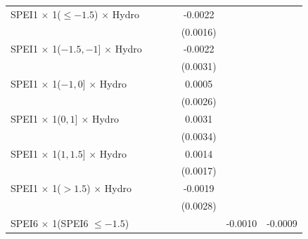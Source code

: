 {\begin{tabular}{l*{6}{c}}
\addlinespace
SPEI1 $\times$ 1($\leq -1.5$) $\times$ Hydro&                     &                     &                     &     -0.0022         &                     &                     \\
                    &                     &                     &                     &    (0.0016)         &                     &                     \\
\addlinespace
SPEI1 $\times$ 1($-1.5,-1$] $\times$ Hydro&                     &                     &                     &     -0.0022         &                     &                     \\
                    &                     &                     &                     &    (0.0031)         &                     &                     \\
\addlinespace
SPEI1 $\times$ 1($-1,0$] $\times$ Hydro&                     &                     &                     &      0.0005         &                     &                     \\
                    &                     &                     &                     &    (0.0026)         &                     &                     \\
\addlinespace
SPEI1 $\times$ 1($0,1$] $\times$ Hydro&                     &                     &                     &      0.0031         &                     &                     \\
                    &                     &                     &                     &    (0.0034)         &                     &                     \\
\addlinespace
SPEI1 $\times$ 1($1,1.5$] $\times$ Hydro&                     &                     &                     &      0.0014         &                     &                     \\
                    &                     &                     &                     &    (0.0017)         &                     &                     \\
\addlinespace
SPEI1 $\times$ 1($> 1.5$) $\times$ Hydro&                     &                     &                     &     -0.0019         &                     &                     \\
                    &                     &                     &                     &    (0.0028)         &                     &                     \\
\addlinespace
SPEI6 $\times$ 1(SPEI6 $\leq -1.5$)&                     &                     &                     &                     &     -0.0010         &     -0.0009         \\

\end{tabular}}
